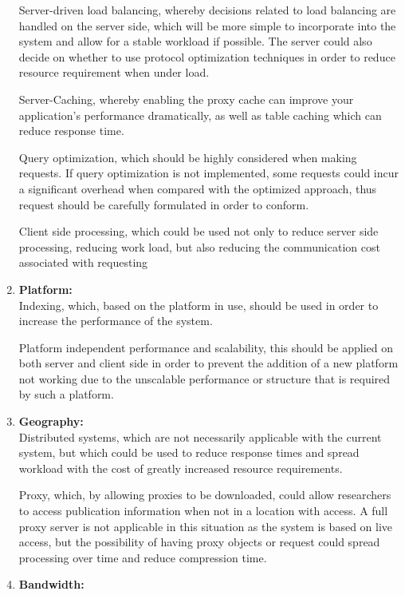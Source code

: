 \documentclass{article}
\begin{document}
\begin{enumerate}
				Server-driven load balancing, whereby decisions related to load balancing are handled on the server side, which will be more simple to incorporate into the system and allow for a stable workload if possible. The server could also decide on whether to use protocol optimization techniques in order to reduce resource requirement when under load.

				Server-Caching, whereby enabling the proxy cache can improve your application's performance dramatically, as well as table caching which can reduce response time.

				Query optimization, which should be highly considered when making requests. If query optimization is not implemented, some requests could incur a significant overhead when compared with the optimized approach, thus request should be carefully formulated in order to conform.

				Client side processing, which could be used not only to reduce server side processing, reducing work load, but also reducing the communication cost associated with requesting

				\item{\bfseries Platform:}\\

				Indexing, which, based on the platform in use, should be used in order to increase the performance of the system.

				Platform independent performance and scalability, this should be applied on both server and client side in order to prevent the addition of a new platform not working due to the unscalable performance or structure that is required by such a platform.

				\item{\bfseries Geography:}\\

				Distributed systems, which are not necessarily applicable with the current system, but which could be used to reduce response times and spread workload with the cost of greatly increased resource requirements.

				Proxy, which, by allowing proxies to be downloaded, could allow researchers to access publication information when not in a location with access. A full proxy server is not applicable in this situation as the system is based on live access, but the possibility of having proxy objects or request could spread processing over time and reduce compression time.

				\item{\bfseries Bandwidth:}\\


\end{enumerate}
\end{document}

